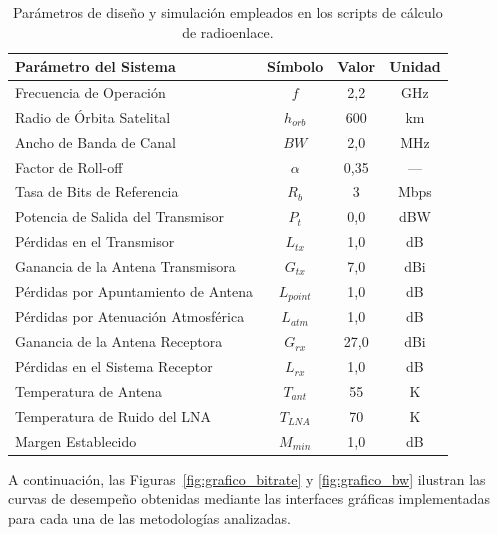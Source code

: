 \begin{table}[H]
    \centering
    \caption{Parámetros de diseño y simulación empleados en los scripts de cálculo de radioenlace.}
    \label{tab:parametros_scripts}
    \begin{tabular}{lccc}
        \hline\hline
        \textbf{Parámetro del Sistema}      & \textbf{Símbolo} & \textbf{Valor}  & \textbf{Unidad} \\
        \hline
        Frecuencia de Operación             & $f$              & 2,2             & GHz  \\
        Radio de Órbita Satelital           & $h_{orb}$        & 600             & km   \\
        Ancho de Banda de Canal             & $BW$             & 2,0             & MHz  \\
        Factor de Roll-off                  & $\alpha$         & 0,35            & ---  \\
        Tasa de Bits de Referencia          & $R_b$            & 3               & Mbps \\
        Potencia de Salida del Transmisor   & $P_t$            & 0,0             & dBW  \\
        Pérdidas en el Transmisor           & $L_{tx}$         & 1,0             & dB   \\
        Ganancia de la Antena Transmisora   & $G_{tx}$         & 7,0             & dBi  \\
        Pérdidas por Apuntamiento de Antena & $L_{point}$      & 1,0             & dB   \\
        Pérdidas por Atenuación Atmosférica & $L_{atm}$        & 1,0             & dB   \\
        Ganancia de la Antena Receptora     & $G_{rx}$         & 27,0            & dBi  \\
        Pérdidas en el Sistema Receptor     & $L_{rx}$         & 1,0             & dB   \\
        Temperatura de Antena               & $T_{ant}$        & 55              & K    \\
        Temperatura de Ruido del LNA        & $T_{LNA}$        & 70              & K    \\
        Margen Establecido                  & $M_{min}$        & 1,0             & dB   \\
        \hline\hline
    \end{tabular}
\end{table}

A continuación, las Figuras~\ref{fig:grafico_bitrate} y \ref{fig:grafico_bw} ilustran las curvas de desempeño obtenidas mediante las interfaces gráficas implementadas para cada una de las metodologías analizadas.


